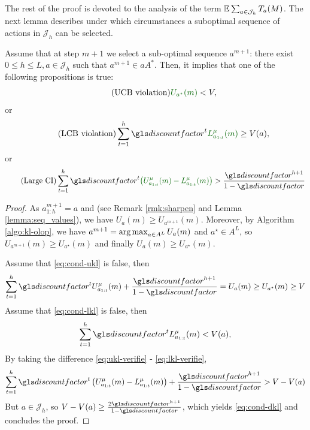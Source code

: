 The rest of the proof is devoted to the analysis of the term $\operatorname*{\mathbb{E}} \sum_{a\in \mathcal{J}_h} T_a(M)$. The next lemma describes under which circumstances a suboptimal sequence of actions in $\mathcal{J}_h$ can be selected.

\begin{lemma}
	\label{lemma:sub-optimal-pull}
	\begin{leftbar}[lemmabar]
	Assume that at step $m+1$ we select a sub-optimal sequence $a^{m+1}$: there exist $0 \leq h \leq L,  a\in \mathcal{J}_h$ such that $a^{m+1} \in aA^{\ast}$. Then, it implies that one of the following propositions is true:
	\begin{equation}
	\label{eq:cond-ukl}
	\tag{UCB violation}
	\diff{U_{a^{\star}}(m)} < V,
	\end{equation}
	or
	\begin{equation}
	\tag{LCB violation}
	\label{eq:cond-lkl}
	\sum_{t=1}^h \discount^t \diff{L^{\mu}_{a_{1:t}}(m)} \geq V(a),
	\end{equation}
	or
	\begin{equation}
	\tag{Large CI}
	\label{eq:cond-dkl}
	\sum_{t=1}^h \discount^t\diff{\left(U^{\mu}_{a_{1:t}}(m) - L^{\mu}_{a_{1:t}}(m)\right)} > \frac{\discount^{h+1}}{1-\discount}
	\end{equation}
	\end{leftbar}
\end{lemma}
\begin{proof}
	As $a^{m+1}_{1:h} = a$ and  (see Remark \ref{rmk:sharpen} and Lemma \ref{lemma:seq_values}), we have $U_a(m) \geq U_{a^{m+1}}(m)$. Moreover, by Algorithm \ref{algo:kl-olop}, we have $a^{m+1} = \operatorname*{arg\,max}_{a \in A^L}  U_a(m)$ and $a^{\star}\in A^L$, so $U_{a^{m+1}}(m) \geq U_{a^{\star}}(m)$ and finally $U_a(m) \geq U_{a^{\star}}(m)$.
	
	Assume that \eqref{eq:cond-ukl} is false, then
	\begin{equation}
	\label{eq:ukl-verifie}
	\sum_{t=1}^h \discount^t U^{\mu}_{a_{1:t}}(m) + \frac{\discount^{h+1}}{1-\discount} = U_a(m) \geq U_{a^{\star}}(m) \geq V
	\end{equation}
	Assume that \eqref{eq:cond-lkl} is false, then
	\begin{equation}
	\label{eq:lkl-verifie}
	\sum_{t=1}^h \discount^t L^{\mu}_{a_{1:t}}(m) < V(a),
	\end{equation}
	By taking the difference \eqref{eq:ukl-verifie} - \eqref{eq:lkl-verifie}, 
	\begin{equation*}
	\sum_{t=1}^h \discount^t \left(U^{\mu}_{a_{1:t}}(m) - L^{\mu}_{a_{1:t}}(m)\right) + \frac{\discount^{h+1}}{1-\discount} > V - V(a)
	\end{equation*}
	But $a \in \mathcal{J}_h$, so $V - V(a) \geq \frac{2\discount^{h+1}}{1-\discount}$, which yields \eqref{eq:cond-dkl} and concludes the proof.
\end{proof}

